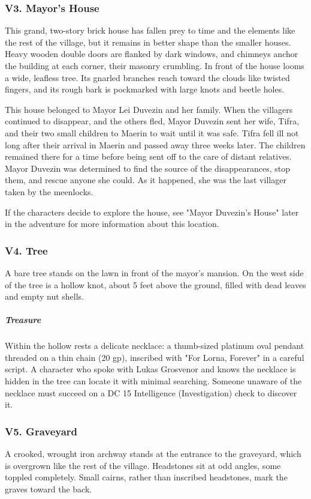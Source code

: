 \documentclass[10pt,a4paper,twoside,bg=print,twocolumn,openany,nodeprecatedcode]{dndbook}
\begin{document}
\subsubsection{V3. Mayor's House}
\begin{DndReadAloud}{}
This grand, two-story brick house has fallen prey to time and the elements like the rest of the village, but it remains in better shape than the smaller houses. Heavy wooden double doors are flanked by dark windows, and chimneys anchor the building at each corner, their masonry crumbling. In front of the house looms a wide, leafless tree. Its gnarled branches reach toward the clouds like twisted fingers, and its rough bark is pockmarked with large knots and beetle holes.

\end{DndReadAloud}

This house belonged to Mayor Lei Duvezin and her family. When the villagers continued to disappear, and the others fled, Mayor Duvezin sent her wife, Tifra, and their two small children to Maerin to wait until it was safe. Tifra fell ill not long after their arrival in Maerin and passed away three weeks later. The children remained there for a time before being sent off to the care of distant relatives. Mayor Duvezin was determined to find the source of the disappearances, stop them, and rescue anyone she could. As it happened, she was the last villager taken by the meenlocks.

If the characters decide to explore the house, see "Mayor Duvezin's House" later in the adventure for more information about this location.

\subsubsection{V4. Tree}
A bare tree stands on the lawn in front of the mayor's mansion. On the west side of the tree is a hollow knot, about 5 feet above the ground, filled with dead leaves and empty nut shells.

\subparagraph{Treasure}
Within the hollow rests a delicate necklace: a thumb-sized platinum oval pendant threaded on a thin chain (20 gp), inscribed with "For Lorna, Forever" in a careful script. A character who spoke with Lukas Grosvenor and knows the necklace is hidden in the tree can locate it with minimal searching. Someone unaware of the necklace must succeed on a DC 15 Intelligence (Investigation) check to discover it.

\subsubsection{V5. Graveyard}
\begin{DndReadAloud}{}
A crooked, wrought iron archway stands at the entrance to the graveyard, which is overgrown like the rest of the village. Headstones sit at odd angles, some toppled completely. Small cairns, rather than inscribed headstones, mark the graves toward the back.

\end{DndReadAloud}
\end{document}
